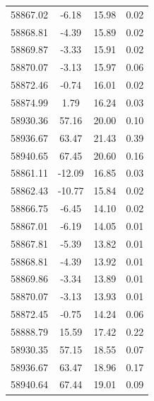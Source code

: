 \begin{longtable}{|c|c|c|c|}
 58867.02 &   -6.18 &       15.98 &          0.02 \\
 58868.81 &   -4.39 &       15.89 &          0.02 \\
 58869.87 &   -3.33 &       15.91 &          0.02 \\
 58870.07 &   -3.13 &       15.97 &          0.06 \\
 58872.46 &   -0.74 &       16.01 &          0.02 \\
 58874.99 &    1.79 &       16.24 &          0.03 \\
 58930.36 &   57.16 &       20.00 &          0.10 \\
 58936.67 &   63.47 &       21.43 &          0.39 \\
 58940.65 &   67.45 &       20.60 &          0.16 \\
 58861.11 &  -12.09 &       16.85 &          0.03 \\
 58862.43 &  -10.77 &       15.84 &          0.02 \\
 58866.75 &   -6.45 &       14.10 &          0.02 \\
 58867.01 &   -6.19 &       14.05 &          0.01 \\
 58867.81 &   -5.39 &       13.82 &          0.01 \\
 58868.81 &   -4.39 &       13.92 &          0.01 \\
 58869.86 &   -3.34 &       13.89 &          0.01 \\
 58870.07 &   -3.13 &       13.93 &          0.01 \\
 58872.45 &   -0.75 &       14.24 &          0.06 \\
 58888.79 &   15.59 &       17.42 &          0.22 \\
 58930.35 &   57.15 &       18.55 &          0.07 \\
 58936.67 &   63.47 &       18.96 &          0.17 \\
 58940.64 &   67.44 &       19.01 &          0.09 \\
 \hline\end{longtable}


